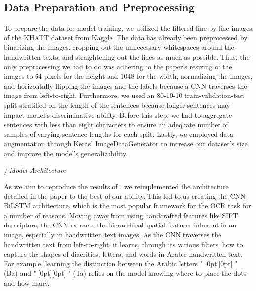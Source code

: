 \documentclass[conference]{IEEEtran}
\newcommand{\artext}[1]{%
  {\fontsize{8pt}{11pt}\selectfont \raisebox{0pt}[0pt][0pt]{\RL{#1}}}%
}
\newcounter{customsubsubsection} %
\renewcommand{\subsubsection}[1]{%
  \stepcounter{customsubsubsection}%
  \vspace{0.5em} %
  \textit{\arabic{customsubsubsection}) #1}%
  \vspace{0.5em} %
}
\let\oldsubsection\subsection
\renewcommand{\subsection}[1]{%
  \oldsubsection{#1}%
  \setcounter{customsubsubsection}{0}%
}
\begin{document}
\subsection{Data Preparation and Preprocessing}



To prepare the data for model training, we utilized the filtered line-by-line images of the KHATT dataset from Kaggle. The data has already been preprocessed by binarizing the images, cropping out the unnecessary whitespaces around the handwritten texts, and straightening out the lines as much as possible. Thus, the only preprocessing we had to do was adhering to the paper's \cite{mutawa2024machine} resizing of the images to 64 pixels for the height and 1048 for the width, normalizing the images, and horizontally flipping the images and the labels because a CNN traverses the image from left-to-right. Furthermore, we used an 80-10-10 train-validation-test split stratified on the length of the sentences because longer sentences may impact model's discriminative ability. Before this step, we had to aggregate sentences with less than eight characters to ensure an adequate number of samples of varying sentence lengths for each split. Lastly, we employed data augmentation through Keras' ImageDataGenerator to increase our dataset's size and improve the model's generalizability.

\subsubsection{Model Architecture}

As we aim to reproduce the results of \cite{mutawa2024machine}, we reimplemented the architecture detailed in the paper to the best of our ability. This led to us creating the CNN-BiLSTM architecture, which is the most popular framework for the OCR task \cite{ahmad2020deep, aabed2024end, mosbah2024adocrnet,mutawa2024machine,saeed2024muharaf} for a number of reasons. Moving away from using handcrafted features like SIFT descriptors, the CNN extracts the hierarchical spatial features inherent in an image, especially in handwritten text images. As the CNN traverses the handwritten text from left-to-right, it learns, through its various filters, how to capture the shapes of diacritics, letters, and words in Arabic handwritten text. For example, learning the distinction between the Arabic letters "\artext{ب}" (Ba) and "\artext{ت}" (Ta) relies on the model knowing where to place the dots and how many.
\end{document}

